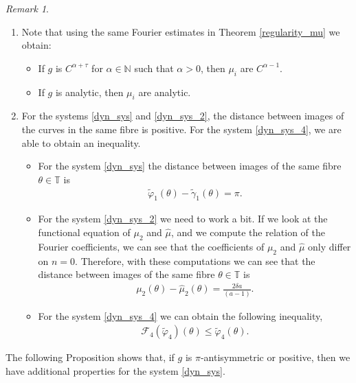 \documentclass[12pt]{article}
\newcommand{\N}{\mathbb{N}}
\newcommand{\T}{\mathbb{T}}
\theoremstyle{plain}
\theoremstyle{remark}
\newtheorem{remark}[defn]{Remark}
\theoremstyle{definition}
\begin{document}
\begin{remark}\label{remarks_curves}
    \begin{enumerate}[label=(\roman*)]
        \item\label{regularity_remark} Note that using the same Fourier estimates in Theorem \ref{regularity_mu} we obtain:
        \begin{itemize}
            \item If $g$ is $C^{\alpha+\tau}$ for $\alpha\in\N$ such that $\alpha>0$, then $\mu_i$ are $C^{\alpha-1}$.
            \item If $g$ is analytic, then $\mu_i$ are analytic.
        \end{itemize}
        \item For the systems \eqref{dyn_sys} and \eqref{dyn_sys_2}, the distance between images of the curves in the same fibre is positive. For the system \eqref{dyn_sys_4}, we are able to obtain an inequality.
        \begin{itemize}
            \item For the system \eqref{dyn_sys} the distance between images of the same fibre $\theta\in\T$ is
            \begin{align*}
                \tilde\varphi_1(\theta)-\tilde\gamma_1(\theta)=\pi.
            \end{align*}
            \item For the system \eqref{dyn_sys_2} we need to work a bit. If we look at the functional equation of $\mu_2$ and $\hat\mu$, and we compute the relation of the Fourier coefficients, we can see that the coefficients of $\mu_2$ and $\hat\mu$ only differ on $n=0$. Therefore, with these computations we can see that the distance between images of the same fibre $\theta\in\T$ is
            \begin{align*}
                \mu_2(\theta)-\hat\mu_2(\theta)=\frac{2\delta a}{(a-1)}.
            \end{align*}
            \item For the system \eqref{dyn_sys_4} we can obtain the following inequality,
            \begin{align*}
                \mathcal{F}_4(\tilde\varphi_4)(\theta)\leq \tilde\varphi_4(\theta).
            \end{align*}
        \end{itemize}
    \end{enumerate}
    
\end{remark}
The following Proposition shows that, if $g$ is $\pi$-antisymmetric or positive, then we have additional properties for the system \eqref{dyn_sys}.
\end{document}
